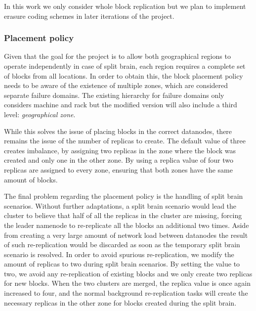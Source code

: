 In this work we only consider whole block replication but we plan to implement erasure coding schemes in later iterations of the project.

\subsubsection{Placement policy}
Given that the goal for the project is to allow both geographical regions to operate independently in case of split brain, each region requires a complete set of blocks from all locations.
In order to obtain this, the block placement policy needs to be aware of the existence of multiple zones, which are considered separate failure domains.
The existing hierarchy for failure domains only considers machine and rack but the modified version will also include a third level: \emph{geographical zone}.

While this solves the issue of placing blocks in the correct datanodes, there remains the issue of the number of replicas to create.
The default value of three creates imbalance, by assigning two replicas in the zone where the block was created and only one in the other zone.
By using a replica value of four two replicas are assigned to every zone, ensuring that both zones have the same amount of blocks.

The final problem regarding the placement policy is the handling of split brain scenarios.
Without further adaptations, a split brain scenario would lead the cluster to believe that half of all the replicas in the cluster are missing, forcing the leader namenode to re-replicate all the blocks an additional two times.
Aside from creating a very large amount of network load between datanodes the result of such re-replication would be discarded as soon as the temporary split brain scenario is resolved.
In order to avoid spurious re-replication, we modify the amount of replicas to two during split brain scenarios.
By setting the value to two, we avoid any re-replication of existing blocks and we only create two replicas for new blocks.
When the two clusters are merged, the replica value is once again increased to four, and the normal background re-replication tasks will create the necessary replicas in the other zone for blocks created during the split brain.